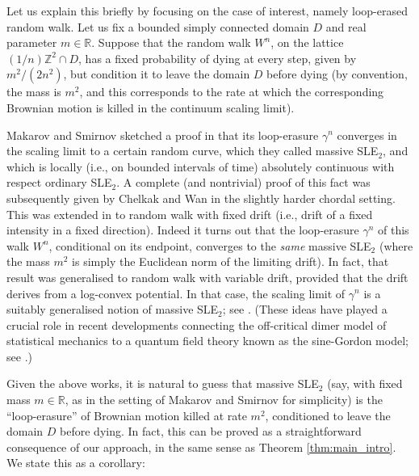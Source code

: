 \documentclass[11pt]{article}
\def\R{{\mathbb R}}
\begin{document}
Let us explain this briefly by focusing on the case of interest, namely loop-erased random walk. Let us fix a bounded simply connected domain $D$ and real parameter $m \in \R$. Suppose that the random walk $W^n$, on the lattice $ (1/n) \mathbb{Z}^2 \cap D$, has a fixed probability of dying at every step, given by $m^2/(2n^2)$, but condition it to leave the domain $D$ before dying (by convention, the mass is $m^2$, and this corresponds to the rate at which the corresponding Brownian motion is killed in the continuum scaling limit). 

Makarov and Smirnov sketched a proof in 
\cite{MakarovSmirnov} that its loop-erasure $\gamma^n$ converges in the scaling limit to a certain random curve, which they called massive SLE$_2$, and which is locally (i.e., on bounded intervals of time) absolutely continuous with respect ordinary SLE$_2$. A complete (and nontrivial) proof of this fact was subsequently given by Chelkak and Wan \cite{ChelkakWan} in the slightly harder chordal setting. This was extended in \cite{BHS} to random walk with fixed drift (i.e., drift of a fixed intensity in a fixed direction). Indeed it turns out that the loop-erasure $\gamma^n$ of this walk $W^n$, conditional on its endpoint, converges to the \emph{same} massive SLE$_2$ (where the mass $m^2$ is simply the Euclidean norm of the limiting drift). In fact, that result was generalised to random walk with variable drift, provided that the drift derives from a log-convex potential. In that case, the scaling limit of $\gamma^n$ is a suitably generalised notion of massive SLE$_2$; see \cite{BHS}. (These ideas have played a crucial role in recent developments connecting the off-critical dimer model of statistical mechanics to a quantum field theory known as the sine-Gordon model; see \cite{BHS, BMR}.)


\medskip Given the above works, it is natural
to guess that massive SLE$_2$ (say, with fixed mass $m\in \R$, as in the setting of Makarov and Smirnov \cite{MakarovSmirnov} for simplicity) is the ``loop-erasure'' of Brownian motion killed at rate $m^2$, conditioned to leave the domain $D$ before dying. In fact, this can be proved as a straightforward consequence of our approach, in the same sense as Theorem \ref{thm:main_intro}. We state this as a corollary:
\end{document}
